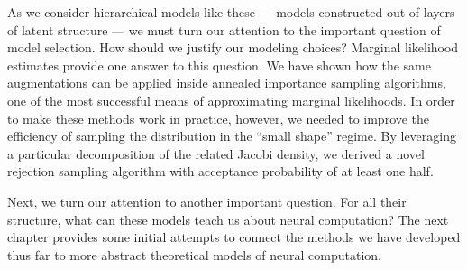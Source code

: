 As we consider hierarchical models like these --- models constructed out of
layers of latent structure --- we must turn our attention to the
important question of model selection. How should we justify our
modeling choices? Marginal likelihood estimates provide one answer
to this question. We have shown how the same \polyagamma augmentations
can be applied inside annealed importance sampling algorithms,
one of the most successful means of approximating marginal likelihoods.
In order to make these methods work in practice, however, we needed to
improve the efficiency of sampling the \polyagamma distribution in the
``small shape'' regime. By leveraging a particular decomposition of the
related Jacobi density, we derived a novel rejection sampling algorithm
with acceptance probability of at least one half.

Next, we turn our attention
to another important question. For all their structure, what can these
models teach us about neural computation? The next chapter provides some
initial attempts to connect the methods we have developed thus far to more
abstract theoretical models of neural computation. 

